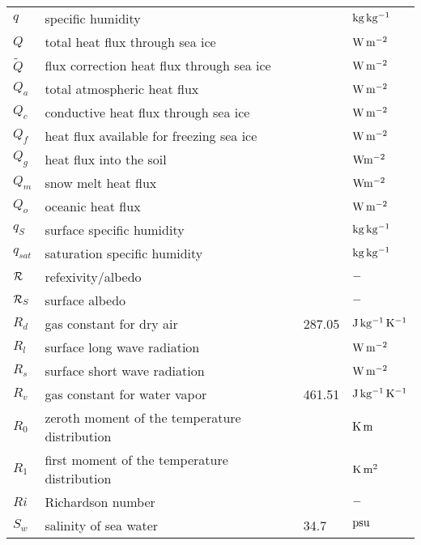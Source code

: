\begin{tabular*}{\textwidth}{l@{\extracolsep\fill}lll}
$q$       & specific humidity                     &         & $\rm kg\,
kg^{-1}$ \\
$Q$       & total heat flux through sea ice       &         & $\rm W\, m^{-2}$
\\
$\tilde{Q}$    & flux correction heat flux through sea ice  &         & $\rm W\, m^{-2}$
\\
$Q_a$          & total atmospheric heat flux                &         & $\rm W\,
m^{-2}$ \\
$Q_c$          & conductive heat flux through sea ice       &         & $\rm W\,
m^{-2}$ \\
$Q_f$          & heat flux available for freezing sea ice   &         & $\rm W\, m^{-2}$
\\
$Q_g$     & heat flux into the soil     &    & $\rm W m^{-2}$ \\
$Q_m$     & snow melt heat flux    &    & $\rm W m^{-2}$ \\
$Q_o$          & oceanic heat flux                     &         & $\rm W\, m^{-2}$
\\
$q_S$          & surface specific humidity             &         & $\rm kg\,
kg^{-1}$ \\
$q_{sat}$      & saturation specific humidity               &         & $\rm kg\,
kg^{-1}$ \\
${\cal R}$     & refexivity/albedo      &    &$\rm -$ \\
${\cal R}_S$   & surface albedo    &    & $\rm -$ \\
$R_d$          & gas constant for dry air              & 287.05  & $\rm J\,
kg^{-1}\, K^{-1}$ \\
$R_l$          & surface long wave radiation           &         & $\rm W\,
m^{-2}$ \\
$R_s$          & surface short wave radiation               &         & $\rm W\,
m^{-2}$ \\
$R_v$          & gas constant for water vapor               & 461.51  &
$\rm J\, kg^{-1}\, K^{-1}$ \\
$R_{0}$   & zeroth moment of the temperature distribution   &         & $\rm K\,
m$ \\
$R_{1}$   & first moment of the temperature distribution    &         & $\rm K\,
m^2$ \\
$Ri$           & Richardson number                     &         & $\rm -$ \\ 
$S_w$          & salinity of sea water                 & 34.7    
     & $\rm psu$ \\


\end{tabular*}

